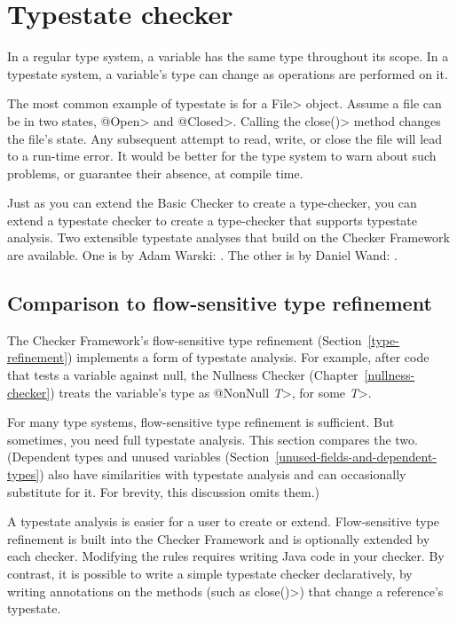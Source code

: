 \htmlhr
\chapter{Typestate checker\label{typestate-checker}}

In a regular type system, a variable has the same type throughout its
scope.
In a typestate system, a variable's type can change as operations
are performed on it.

The most common example of typestate is for a \<File> object.  Assume a file
can be in two states, \<@Open> and \<@Closed>.  Calling the \<close()> method
changes the file's state.  Any subsequent attempt to read, write, or close
the file will lead to a run-time error.  It would be better for the type
system to warn about such problems, or guarantee their absence, at compile
time.

Just as you can extend the Basic Checker to create a type-checker, you can
extend a typestate checker to create a type-checker that supports typestate
analysis.  Two extensible typestate analyses that build on the Checker
Framework are available.  One is by Adam Warski:
.
The other is by Daniel Wand:
.


\section{Comparison to flow-sensitive type refinement\label{typestate-vs-type-refinement}}

The Checker Framework's flow-sensitive type refinement
(Section~\ref{type-refinement}) implements a form of typestate analysis.
For example, after code that tests a variable against null, the Nullness
Checker (Chapter~\ref{nullness-checker}) treats the variable's type as
\<@NonNull \emph{T}>, for some \<\emph{T}>\@.

For many type systems, flow-sensitive type refinement is sufficient.  But
sometimes, you need full typestate analysis.  This section compares the
two.  (Dependent types and unused variables
(Section~\ref{unused-fields-and-dependent-types}) also have similarities
with typestate analysis and can occasionally substitute for it.  For
brevity, this discussion omits them.)

A typestate analysis is easier for a user to create or extend.
Flow-sensitive type refinement is built into the Checker Framework and is
optionally extended by each checker.  Modifying the rules requires writing
Java code in your checker.  By contrast, it is possible to write a simple
typestate checker declaratively, by writing annotations on the methods
(such as \<close()>) that change a reference's typestate.

